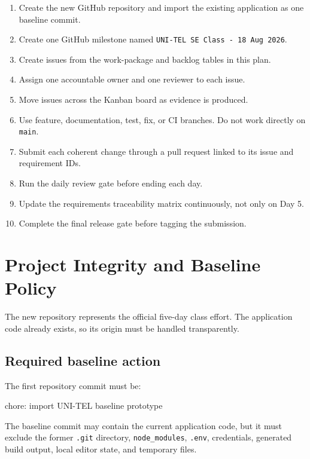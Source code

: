 \documentclass[
  10pt,
  a4paper,
  oneside]{report}
\newenvironment{Shaded}{}{}
\newcommand{\NormalTok}[1]{#1}
\providecommand{\tightlist}{%
  \setlength{\itemsep}{0pt}\setlength{\parskip}{0pt}}
\begin{document}
\begin{enumerate}
\def\labelenumi{\arabic{enumi}.}
\tightlist
\item
  Create the new GitHub repository and import the existing application
  as one baseline commit.
\item
  Create one GitHub milestone named
  \texttt{UNI-TEL\ SE\ Class\ -\ 18\ Aug\ 2026}.
\item
  Create issues from the work-package and backlog tables in this plan.
\item
  Assign one accountable owner and one reviewer to each issue.
\item
  Move issues across the Kanban board as evidence is produced.
\item
  Use feature, documentation, test, fix, or CI branches. Do not work
  directly on \texttt{main}.
\item
  Submit each coherent change through a pull request linked to its issue
  and requirement IDs.
\item
  Run the daily review gate before ending each day.
\item
  Update the requirements traceability matrix continuously, not only on
  Day 5.
\item
  Complete the final release gate before tagging the submission.
\end{enumerate}

\chapter{Project Integrity and Baseline
Policy}\label{3-project-integrity-and-baseline-policy}

The new repository represents the official five-day class effort. The
application code already exists, so its origin must be handled
transparently.

\section{Required baseline action}\label{31-required-baseline-action}

The first repository commit must be:

\begin{Shaded}
\begin{Highlighting}[]
\NormalTok{chore: import UNI{-}TEL baseline prototype}
\end{Highlighting}
\end{Shaded}

The baseline commit may contain the current application code, but it
must exclude the former \texttt{.git} directory, \texttt{node\_modules},
\texttt{.env}, credentials, generated build output, local editor state,
and temporary files.
\end{document}
